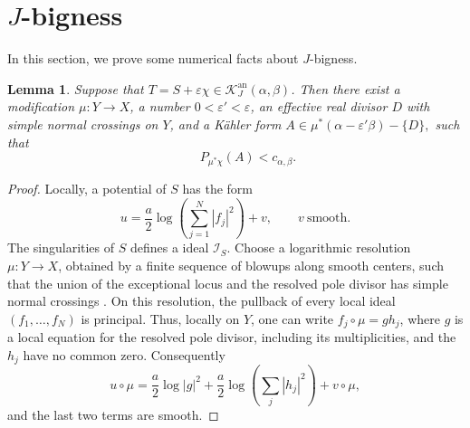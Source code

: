 \documentclass[reqno]{amsart}
\newcommand{\cab}{c_{\alpha,\beta}}
\newcommand{\cI}{\mathcal I}
\theoremstyle{plain}
\newtheorem{lemma}[thm]{Lemma}
\theoremstyle{remark}
\begin{document}
\section{\texorpdfstring{$J$}{J}-bigness}
In this section, we prove some numerical facts about $J$-bigness.
\begin{lemma}\label{lem:birational-certificate}
Suppose that
$T=S+\varepsilon\chi\in
\mathcal K_J^{\mathrm{an}}(\alpha,\beta)$.
Then there exist a modification $\mu:Y\to X$, a number
$0<\varepsilon'<\varepsilon$, an effective real divisor $D$ with
simple normal crossings on $Y$, and a K\"ahler form $A\in\mu^*(\alpha-\varepsilon'\beta)-\{D\},$ such that
\[
 \qquad P_{\mu^*\chi}(A)<\cab.
\]

\end{lemma}
\begin{proof}
Locally, a potential of $S$ has the form
\[
 u=\frac a2\log\!\left(\sum_{j=1}^N|f_j|^2\right)+v,
 \qquad v\ \text{smooth}.
\]
The singularities of $S$ defines a ideal $\cI_S$. 
Choose a  logarithmic resolution $\mu:Y\to X$, obtained by a finite sequence of blowups along smooth
centers, such that the union of the exceptional locus and the resolved
pole divisor has simple normal crossings \cite{H77}. On this
resolution, the pullback of every local ideal
$(f_1,\ldots,f_N)$ is principal. Thus, locally on $Y$, one can write
$f_j\circ\mu=g h_j$, where $g$ is a local equation for the resolved
pole divisor, including its multiplicities, and the $h_j$ have no
common zero. Consequently
\[
 u\circ\mu=\frac a2\log|g|^2
 +\frac a2\log\!\left(\sum_j|h_j|^2\right)+v\circ\mu,
\]
and the last two terms are smooth.


\end{proof}
\end{document}
